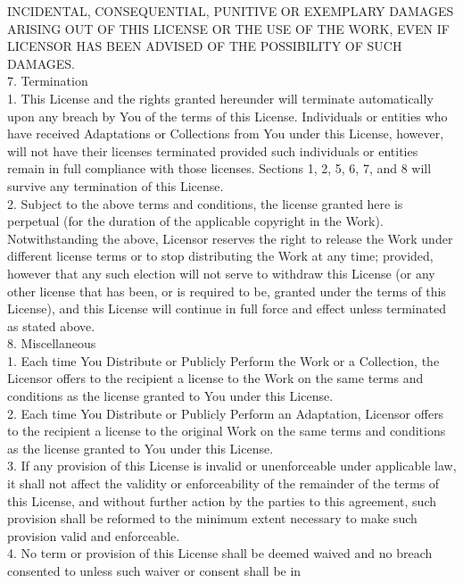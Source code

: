{INCIDENTAL, CONSEQUENTIAL, PUNITIVE OR EXEMPLARY DAMAGES ARISING OUT
OF THIS LICENSE OR THE USE OF THE WORK, EVEN IF LICENSOR HAS BEEN
ADVISED OF THE POSSIBILITY OF SUCH DAMAGES.
\\[4pt]
7. Termination
\\[4pt]
   1. This License and the rights granted hereunder will terminate
   automatically upon any breach by You of the terms of this
   License. Individuals or entities who have received Adaptations or
   Collections from You under this License, however, will not have
   their licenses terminated provided such individuals or entities
   remain in full compliance with those licenses. Sections 1, 2, 5, 6,
   7, and 8 will survive any termination of this License.
\\[4pt]
   2. Subject to the above terms and conditions, the license granted
   here is perpetual (for the duration of the applicable copyright in
   the Work). Notwithstanding the above, Licensor reserves the right
   to release the Work under different license terms or to stop
   distributing the Work at any time; provided, however that any such
   election will not serve to withdraw this License (or any other
   license that has been, or is required to be, granted under the
   terms of this License), and this License will continue in full
   force and effect unless terminated as stated above.
\\[4pt]
8. Miscellaneous
\\[4pt]
   1. Each time You Distribute or Publicly Perform the Work or a
   Collection, the Licensor offers to the recipient a license to the
   Work on the same terms and conditions as the license granted to You
   under this License.
\\[4pt]
   2. Each time You Distribute or Publicly Perform an Adaptation,
   Licensor offers to the recipient a license to the original Work on
   the same terms and conditions as the license granted to You under
   this License.
\\[4pt]
   3. If any provision of this License is invalid or unenforceable
   under applicable law, it shall not affect the validity or
   enforceability of the remainder of the terms of this License, and
   without further action by the parties to this agreement, such
   provision shall be reformed to the minimum extent necessary to make
   such provision valid and enforceable.
\\[4pt]
   4. No term or provision of this License shall be deemed waived and
   no breach consented to unless such waiver or consent shall be in
}
